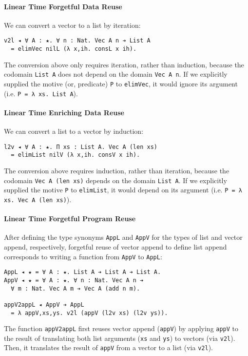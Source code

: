 \documentclass[acmsmall]{acmart}\settopmatter{}
\begin{document}
\paragraph{Linear Time Forgetful Data Reuse}
We can convert a vector to a list by iteration:

\begin{verbatim}
v2l ◂ ∀ A : ★. ∀ n : Nat. Vec A n ➔ List A
  = elimVec nilL (λ x,ih. consL x ih).
\end{verbatim}
The conversion above only requires iteration, rather than induction,
because the codomain \verb;List A; does not depend on the domain
\verb;Vec A n;. If we explicitly supplied the motive (or, predicate)
\verb;P; to \verb;elimVec;, it would ignore its argument
(i.e. \verb;P = λ xs. List A;).

\paragraph{Linear Time Enriching Data Reuse}
We can convert a list to a vector by induction:

\begin{verbatim}
l2v ◂ ∀ A : ★. Π xs : List A. Vec A (len xs)
  = elimList nilV (λ x,ih. consV x ih).
\end{verbatim}
The conversion above requires induction, rather than iteration,
because the codomain \verb;Vec A (len xs); depends on the domain
\verb;List A;. If we explicitly supplied the motive \verb;P; to
\verb;elimList;, it would depend on its argument
(i.e. \verb;P = λ xs. Vec A (len xs);).

\paragraph{Linear Time Forgetful Program Reuse}
After defining the type synonyms \verb;AppL; and \verb;AppV; for the
types of list and vector append, respectively, forgetful reuse of
vector append to define list append corresponds to writing a function from
\verb;AppV; to \verb;AppL;:

\begin{verbatim}
AppL ◂ ★ = ∀ A : ★. List A ➔ List A ➔ List A.
AppV ◂ ★ = ∀ A : ★. ∀ n : Nat. Vec A n ➔ 
  ∀ m : Nat. Vec A m ➔ Vec A (add n m).

appV2appL ◂ AppV ➔ AppL
  = λ appV,xs,ys. v2l (appV (l2v xs) (l2v ys)).
\end{verbatim}
The function \verb;appV2appL; first reuses vector append
(\verb;appV;) by applying \verb;appV; to the result of
translating both list arguments (\verb;xs; and \verb;ys;) to
vectors (via \verb;v2l;). Then, it translates the result of
\verb;appV; from a vector to a list (via \verb;v2l;).
\end{document}
